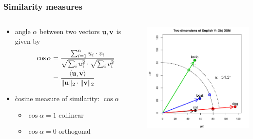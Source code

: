 \begin{frame}
  \frametitle{Similarity measures}
  
  \begin{columns}[c]
    \begin{column}{5cm}
      \begin{itemize}
        \item angle $\alpha$ between two vectors $\vu,\vv$ is given by
          \begin{align*}
            \cos \alpha &= 
            \frac{\sum_{i=1}^n u_i\cdot v_i}{
              \sqrt{\sum_i u_i^2}\cdot \sqrt{\sum_i v_i^2}}
            \\
            &= \frac{\sprod{\vu}{\vv}}{\norm[2]{\vu}\cdot \norm[2]{\vv}}
        \end{align*}
      \item<2-> \h{cosine} measure of similarity: $\cos \alpha$
        \begin{itemize}
        \item $\cos \alpha = 1$ \so collinear
        \item $\cos \alpha = 0$ \so orthogonal
        \end{itemize}
      \end{itemize}
    \end{column}
    \begin{column}{6cm}
      \includegraphics[width=6cm]{img/hieroglyph_2d_5}
    \end{column}
  \end{columns}
\end{frame}

